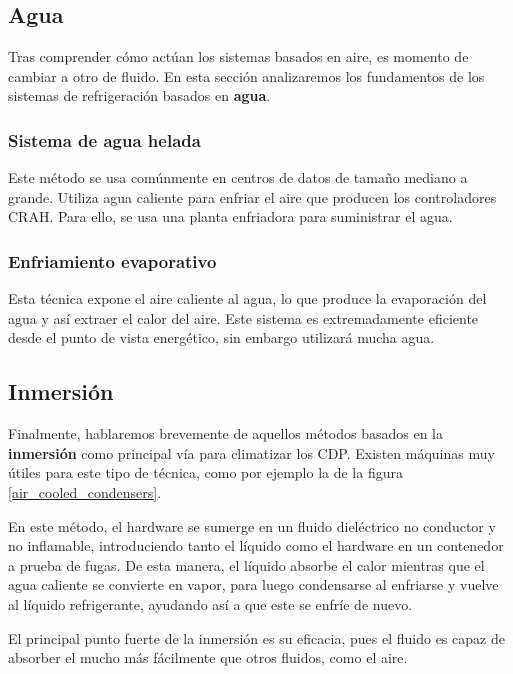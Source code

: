 \subsection{Agua} \label{awa}

Tras comprender cómo actúan los sistemas basados en aire, es momento de cambiar a otro de fluido. En esta sección analizaremos los fundamentos de los sistemas de refrigeración basados en \textbf{agua}.


\subsubsection{Sistema de agua helada}

Este método se usa comúnmente en centros de datos de tamaño mediano a grande. Utiliza agua caliente para enfriar el aire que producen los controladores CRAH. Para ello, se usa una planta enfriadora para suministrar el agua.


\subsubsection{Enfriamiento evaporativo}

Esta técnica expone el aire caliente al agua, lo que produce la evaporación del agua y así extraer el calor del aire. Este sistema es extremadamente eficiente desde el punto de vista energético, sin embargo utilizará mucha agua.



\subsection{Inmersión} \label{inmersion}

Finalmente, hablaremos brevemente de aquellos métodos basados en la \textbf{inmersión} como principal vía para climatizar los CDP. Existen máquinas muy útiles para este tipo de técnica, como por ejemplo la de la figura \eqref{air_cooled_condensers}.

En este método, el hardware se sumerge en un fluido dieléctrico no conductor y no inflamable, introduciendo tanto el líquido como el hardware en un contenedor a prueba de fugas. De esta manera, el líquido absorbe el calor mientras que el agua caliente se convierte en vapor, para luego condensarse al enfriarse y vuelve al líquido refrigerante, ayudando así a que este se enfríe de nuevo.

El principal punto fuerte de la inmersión es su eficacia, pues el fluido es capaz de absorber el mucho más fácilmente que otros fluidos, como el aire.



